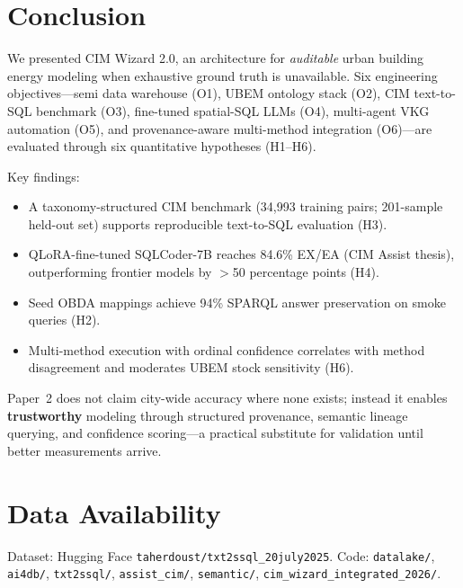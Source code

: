 \section{Conclusion}
\label{sec:conclusion}

We presented CIM Wizard 2.0, an architecture for \emph{auditable} urban building energy modeling when exhaustive ground truth is unavailable.
Six engineering objectives---semi data warehouse (O1), UBEM ontology stack (O2), CIM text-to-SQL benchmark (O3), fine-tuned spatial-SQL LLMs (O4), multi-agent VKG automation (O5), and provenance-aware multi-method integration (O6)---are evaluated through six quantitative hypotheses (H1--H6).

Key findings:
\begin{itemize}[leftmargin=*]
  \item A taxonomy-structured CIM benchmark (34,993 training pairs; 201-sample held-out set) supports reproducible text-to-SQL evaluation (H3).
  \item QLoRA-fine-tuned SQLCoder-7B reaches 84.6\% EX/EA (CIM Assist thesis), outperforming frontier models by $>$50 percentage points (H4).
  \item Seed OBDA mappings achieve 94\% SPARQL answer preservation on smoke queries (H2).
  \item Multi-method execution with ordinal confidence correlates with method disagreement and moderates UBEM stock sensitivity (H6).
\end{itemize}

Paper~2 does not claim city-wide accuracy where none exists; instead it enables \textbf{trustworthy} modeling through structured provenance, semantic lineage querying, and confidence scoring---a practical substitute for validation until better measurements arrive.

\section*{Data Availability}

Dataset: Hugging Face \texttt{taherdoust/txt2ssql\_20july2025}.
Code: \texttt{datalake/}, \texttt{ai4db/}, \texttt{txt2ssql/}, \texttt{assist\_cim/}, \texttt{semantic/}, \texttt{cim\_wizard\_integrated\_2026/}.
